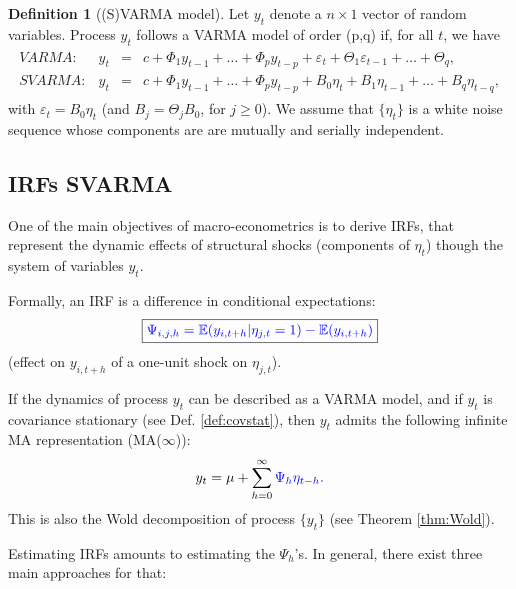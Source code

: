 \documentclass[
]{book}
\theoremstyle{definition}
\newtheorem{definition}{Definition}[chapter]
\theoremstyle{definition}
\theoremstyle{definition}
\theoremstyle{definition}
\theoremstyle{remark}
\begin{document}
\begin{definition}[(S)VARMA model]
\protect\hypertarget{def:SVARMA}{}\label{def:SVARMA}Let \(y_{t}\) denote a \(n \times1\) vector of random variables. Process \(y_{t}\) follows a VARMA model of order (p,q) if, for all \(t\), we have
\begin{eqnarray}
\begin{array}{rllll}
VARMA:& y_t &=& c + \Phi_1 y_{t-1} + \dots + \Phi_p y_{t-p} + \varepsilon_t + \Theta_1\varepsilon_{t-1} + \dots + \Theta_q ,\\
SVARMA:& y_t &=& c + \Phi_1 y_{t-1} + \dots + \Phi_p y_{t-p} + B_0 \eta_t+ B_1 \eta_{t-1} + \dots +  B_q \eta_{t-q},
\end{array}\label{eq:yVARMA}
\end{eqnarray}
with \(\varepsilon_t = B_0\eta_t\) (and \(B_j = \Theta_j B_0\), for \(j \ge 0\)). We assume that \(\{\eta_{t}\}\) is a white noise sequence whose components are are mutually and serially independent.
\end{definition}

\hypertarget{IRFSVARMA}{%
\subsection{IRFs SVARMA}\label{IRFSVARMA}}

One of the main objectives of macro-econometrics is to derive IRFs, that represent the dynamic effects of structural shocks (components of \(\eta_t\)) though the system of variables \(y_t\).

Formally, an IRF is a difference in conditional expectations:
\[
\boxed{\color{blue}{\Psi_{i,j,h}} = \mathbb{E}(y_{i,t+h}|\color{blue}{\eta_{j,t}=1}) - \mathbb{E}(y_{i,t+h})}
\]
(effect on \(y_{i,t+h}\) of a one-unit shock on \(\eta_{j,t}\)).

If the dynamics of process \(y_t\) can be described as a VARMA model, and if \(y_t\) is covariance stationary (see Def. \ref{def:covstat}), then \(y_t\) admits the following infinite MA representation (MA(\(\infty\))):
\begin{equation}
y_t = \mu + \sum_{h=0}^\infty \color{blue}{\Psi_{h}} \eta_{t-h}.\label{eq:InfMA}
\end{equation}
This is also the Wold decomposition of process \(\{y_t\}\) (see Theorem \ref{thm:Wold}).

Estimating IRFs amounts to estimating the \(\Psi_{h}\)'s. In general, there exist three main approaches for that:
\end{document}
